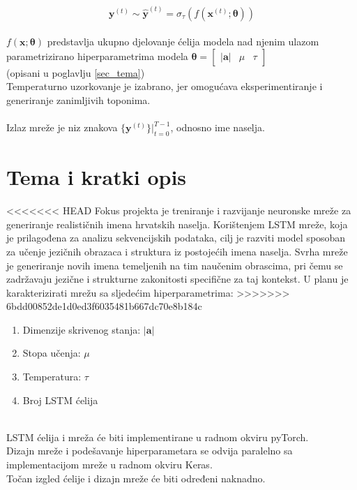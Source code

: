 \documentclass{report}
\begin{document}
\begin{equation}
 \mathbf{y}^{(t)} \sim \hat{\mathbf{y}}^{(t)} = \sigma_{\tau}(f(\mathbf{x}^{(t)} ; \boldsymbol{\theta}))
\end{equation}
\ \\
$f(\mathbf{x} ; \boldsymbol{\theta})$ predstavlja ukupno djelovanje ćelija modela nad njenim ulazom parametrizirano hiperparametrima modela $\boldsymbol{\theta} = \begin{bmatrix} \lvert \mathbf{a} \rvert & \mu & \tau \end{bmatrix}$\\ (opisani u poglavlju \ref{sec_tema})
\ \\
Temperaturno uzorkovanje je izabrano, jer omogućava eksperimentiranje i generiranje zanimljivih toponima.\\
\\
Izlaz mreže je niz znakova $\{\mathbf{y}^{(t)}\} \biggr \rvert_{t=0}^{T-1}$, odnosno ime naselja.

\section{Tema i kratki opis}
<<<<<<< HEAD
\label{sec_tema}
Fokus projekta je treniranje i razvijanje neuronske mreže za generiranje realističnih imena hrvatskih naselja. Korištenjem LSTM mreže, koja je prilagođena za analizu sekvencijskih podataka, cilj je razviti model sposoban za učenje jezičnih obrazaca i struktura iz postojećih imena naselja. Svrha mreže je generiranje novih imena temeljenih na tim naučenim obrascima, pri čemu se zadržavaju jezične i strukturne zakonitosti specifične za taj kontekst. U planu je karakterizirati mrežu sa sljedećim hiperparametrima:
>>>>>>> 6bdd00852de1d0ed3f6035481b667dc70e8b184c
\begin{enumerate}
\item Dimenzije skrivenog stanja: $\lvert \mathbf{a} \rvert$
\item Stopa učenja: $\mu$
\item Temperatura: $\tau$
\item Broj LSTM ćelija
\end{enumerate}
\ \\
LSTM ćelija i mreža će biti implementirane u radnom okviru pyTorch.\\
Dizajn mreže i podešavanje hiperparametara se odvija paralelno sa implementacijom mreže u radnom okviru Keras.\\
Točan izgled ćelije i dizajn mreže će biti određeni naknadno.\\
\end{document}
